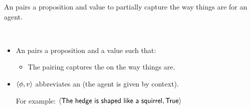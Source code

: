 \begin{note}
  An \evalN{} pairs a proposition and value to partially capture the way things are for an agent.
  \begin{definition}[\evalN{3}]
    \mbox{ }
    \vspace{-\baselineskip}
    \begin{itemize}
    \item
      An \emph{\evalN{}} pairs a proposition and a value such that:
      \begin{itemize}
      \item
        The pairing captures the \agpe{} on the way things are.
      \end{itemize}
    \end{itemize}
    \vspace{-\baselineskip}
  \end{definition}

  \begin{itemize}[leftmargin=*]
  \item
    \(\langle \phi, v \rangle\) abbreviates an  (the agent is given by context).

    For example:
    \(\pv{\prop{The hedge is shaped like a squirrel}}{\val{True}}\)
  \end{itemize}
\end{note}

